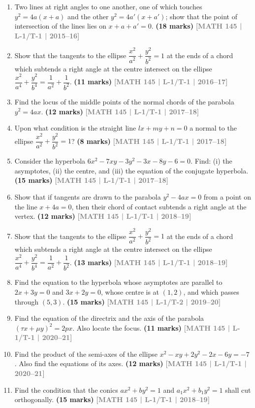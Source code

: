 \documentclass[12pt,a4paper]{article}
\newcommand{\yr}[1]{\hfill\textcolor{gray}{\small\textbf{[#1]}}}
\newcommand{\mk}[1]{\textcolor{orange!70!black}{\small\textbf{(#1 marks)}}}
\begin{document}
\begin{enumerate}
\item Two lines at right angles to one another, one of which touches $y^{2}=4a(x+a)$ and the other $y^{2}=4a'(x+a')$; show that the point of intersection of the lines lies on $x+a+a'=0$.
\mk{18} \yr{MATH 145 | L-1/T-1 | 2015--16}

\item Show that the tangents to the ellipse $\dfrac{x^{2}}{a^{2}}+\dfrac{y^{2}}{b^{2}}=1$ at the ends of a chord which subtends a right angle at the centre intersect on the ellipse $\dfrac{x^{2}}{a^{4}}+\dfrac{y^{2}}{b^{4}}=\dfrac{1}{a^{2}}+\dfrac{1}{b^{2}}$.
\mk{11} \yr{MATH 145 | L-1/T-1 | 2016--17}

\item Find the locus of the middle points of the normal chords of the parabola $y^{2}=4ax$.
\mk{12} \yr{MATH 145 | L-1/T-1 | 2017--18}

\item Upon what condition is the straight line $lx+my+n=0$ a normal to the ellipse $\dfrac{x^{2}}{a^{2}}+\dfrac{y^{2}}{b^{2}}=1$?
\mk{8} \yr{MATH 145 | L-1/T-1 | 2017--18}

\item Consider the hyperbola $6x^{2}-7xy-3y^{2}-3x-8y-6=0$. Find: (i) the asymptotes, (ii) the centre, and (iii) the equation of the conjugate hyperbola.
\mk{15} \yr{MATH 145 | L-1/T-1 | 2017--18}

\item Show that if tangents are drawn to the parabola $y^{2}-4ax=0$ from a point on the line $x+4a=0$, then their chord of contact subtends a right angle at the vertex.
\mk{12} \yr{MATH 145 | L-1/T-1 | 2018--19}

\item Show that the tangents to the ellipse $\dfrac{x^{2}}{a^{2}}+\dfrac{y^{2}}{b^{2}}=1$ at the ends of a chord which subtends a right angle at the centre intersect on the ellipse $\dfrac{x^{2}}{a^{4}}+\dfrac{y^{2}}{b^{4}}=\dfrac{1}{a^{2}}+\dfrac{1}{b^{2}}$.
\mk{13} \yr{MATH 145 | L-1/T-1 | 2018--19}

\item Find the equation to the hyperbola whose asymptotes are parallel to $2x+3y=0$ and $3x+2y=0$, whose centre is at $(1,2)$, and which passes through $(5,3)$.
\mk{15} \yr{MATH 145 | L-1/T-2 | 2019--20}

\item Find the equation of the directrix and the axis of the parabola $(\tau x+\mu y)^{2}=2px$. Also locate the focus.
\mk{11} \yr{MATH 145 | L-1/T-1 | 2020--21}

\item Find the product of the semi-axes of the ellipse $x^{2}-xy+2y^{2}-2x-6y=-7$. Also find the equations of its axes.
\mk{12} \yr{MATH 145 | L-1/T-1 | 2020--21}

\item Find the condition that the conics $ax^{2}+by^{2}=1$ and $a_{1}x^{2}+b_{1}y^{2}=1$ shall cut orthogonally.
\mk{15} \yr{MATH 145 | L-1/T-1 | 2018--19}



\end{enumerate}
\end{document}
